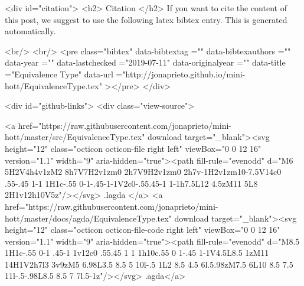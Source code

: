   
  <div id="citation">
  <h2> Citation </h2>
  If you want to cite the content of this post,
  we suggest to use the following latex bibtex entry.
  This is generated automatically.

  <br/>
  <br/>
  <pre class="bibtex"
       data-bibtextag =""
       data-bibtexauthors =""
       data-year =""
       data-lastchecked ="2019-07-11"
       data-originalyear =""
       data-title ="Equivalence Type"
       data-url ="http://jonaprieto.github.io/mini-hott/EquivalenceType.tex"
  ></pre>
  </div>
  

  <div id="github-links">
    <div class="view-source">
      
        <a href="https://raw.githubusercontent.com/jonaprieto/mini-hott/master/src/EquivalenceType.tex" download target="_blank"><svg height="12" class="octicon octicon-file right left" viewBox="0 0 12 16" version="1.1" width="9" aria-hidden="true"><path fill-rule="evenodd" d="M6 5H2V4h4v1zM2 8h7V7H2v1zm0 2h7V9H2v1zm0 2h7v-1H2v1zm10-7.5V14c0 .55-.45 1-1 1H1c-.55 0-1-.45-1-1V2c0-.55.45-1 1-1h7.5L12 4.5zM11 5L8 2H1v12h10V5z"/></svg> .lagda </a>
        <a href="https://raw.githubusercontent.com/jonaprieto/mini-hott/master/docs/agda/EquivalenceType.tex" download target="_blank"><svg height="12" class="octicon octicon-file-code right left" viewBox="0 0 12 16" version="1.1" width="9" aria-hidden="true"><path fill-rule="evenodd" d="M8.5 1H1c-.55 0-1 .45-1 1v12c0 .55.45 1 1 1h10c.55 0 1-.45 1-1V4.5L8.5 1zM11 14H1V2h7l3 3v9zM5 6.98L3.5 8.5 5 10l-.5 1L2 8.5 4.5 6l.5.98zM7.5 6L10 8.5 7.5 11l-.5-.98L8.5 8.5 7 7l.5-1z"/></svg> .agda</a>
      
